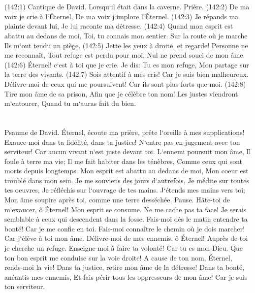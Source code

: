 \chapter{}

\verse (142:1) Cantique de David. Lorsqu`il était dans la caverne. Prière. (142:2) De ma voix je crie à l`Éternel, De ma voix j`implore l`Éternel. 
\verse (142:3) Je répands ma plainte devant lui, Je lui raconte ma détresse. 
\verse (142:4) Quand mon esprit est abattu au dedans de moi, Toi, tu connais mon sentier. Sur la route où je marche Ils m`ont tendu un piège. 
\verse (142:5) Jette les yeux à droite, et regarde! Personne ne me reconnaît, Tout refuge est perdu pour moi, Nul ne prend souci de mon âme. 
\verse (142:6) Éternel! c`est à toi que je crie. Je dis: Tu es mon refuge, Mon partage sur la terre des vivants. 
\verse (142:7) Sois attentif à mes cris! Car je suis bien malheureux. Délivre-moi de ceux qui me poursuivent! Car ils sont plus forts que moi. 
\verse (142:8) Tire mon âme de sa prison, Afin que je célèbre ton nom! Les justes viendront m`entourer, Quand tu m`auras fait du bien. 

\chapter{}

\verse Psaume de David. Éternel, écoute ma prière, prête l`oreille à mes supplications! Exauce-moi dans ta fidélité, dans ta justice! 
\verse N`entre pas en jugement avec ton serviteur! Car aucun vivant n`est juste devant toi. 
\verse L`ennemi poursuit mon âme, Il foule à terre ma vie; Il me fait habiter dans les ténèbres, Comme ceux qui sont morts depuis longtemps. 
\verse Mon esprit est abattu au dedans de moi, Mon coeur est troublé dans mon sein. 
\verse Je me souviens des jours d`autrefois, Je médite sur toutes tes oeuvres, Je réfléchis sur l`ouvrage de tes mains. 
\verse J`étends mes mains vers toi; Mon âme soupire après toi, comme une terre desséchée. Pause. 
\verse Hâte-toi de m`exaucer, ô Éternel! Mon esprit se consume. Ne me cache pas ta face! Je serais semblable à ceux qui descendent dans la fosse. 
\verse Fais-moi dès le matin entendre ta bonté! Car je me confie en toi. Fais-moi connaître le chemin où je dois marcher! Car j`élève à toi mon âme. 
\verse Délivre-moi de mes ennemis, ô Éternel! Auprès de toi je cherche un refuge. 
\verse Enseigne-moi à faire ta volonté! Car tu es mon Dieu. Que ton bon esprit me conduise sur la voie droite! 
\verse A cause de ton nom, Éternel, rends-moi la vie! Dans ta justice, retire mon âme de la détresse! 
\verse Dans ta bonté, anéantis mes ennemis, Et fais périr tous les oppresseurs de mon âme! Car je suis ton serviteur. 

